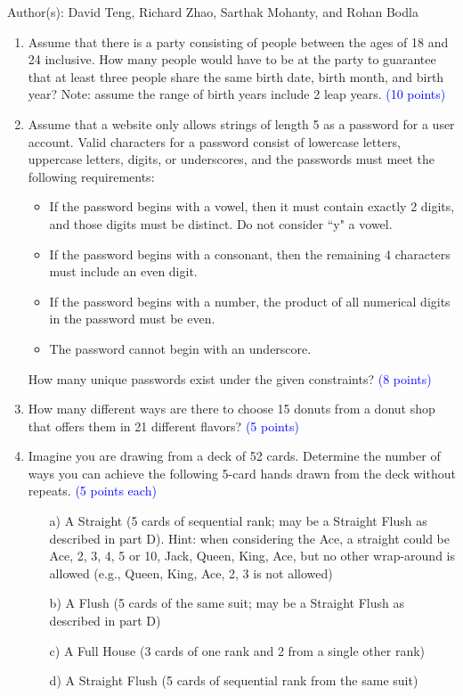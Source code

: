 \documentclass{article}
\newcommand{\pt}[1]{\textcolor{blue}{(#1 points)}}
\newcommand{\pte}[1]{\textcolor{blue}{(#1 points each)}}
\begin{document}
Author(s): David Teng, Richard Zhao, Sarthak Mohanty, and Rohan Bodla
\newpage
\begin{enumerate}

\item Assume that there is a party consisting of people between the ages of 18 and 24 inclusive. How many people would have to be at the party to guarantee that at least three people share the same birth date, birth month, and birth year? Note: assume the range of birth years include 2 leap years. \pt{10}

\item Assume that a website only allows strings of length 5 as a password for a user account. Valid characters for a password consist of lowercase letters, uppercase letters, digits, or underscores, and the passwords must meet the following requirements:
\begin{itemize}
    \item If the password begins with a vowel, then it must contain exactly 2 digits, and those digits must be distinct. Do not consider ``y" a vowel.
    \item If the password begins with a consonant, then the remaining 4 characters must include an even digit.
    \item If the password begins with a number, the product of all numerical digits in the password must be even.
    \item The password cannot begin with an underscore.
\end{itemize} How many unique passwords exist under the given constraints? \pt{8}

\item How many different ways are there to choose 15 donuts from a donut shop that offers them in 21 different flavors?  \pt{5}

\item Imagine you are drawing from a deck of 52 cards. Determine the number of ways you can achieve the following 5-card hands drawn from the deck without repeats. \pte{5}
\begin{enumerate}
    \item[a)] A Straight (5 cards of sequential rank; may be a Straight Flush as described in part D). Hint: when considering the Ace, a straight could be Ace, 2, 3, 4, 5 or 10, Jack, Queen, King, Ace, but no other wrap-around is allowed (e.g., Queen, King, Ace, 2, 3 is not allowed)
    \item[b)] A Flush (5 cards of the same suit; may be a Straight Flush as described in part D)
    \item[c)] A Full House (3 cards of one rank and 2 from a single other rank)
    \item[d)] A Straight Flush (5 cards of sequential rank from the same suit)
\end{enumerate}


\end{enumerate}
\end{document}
